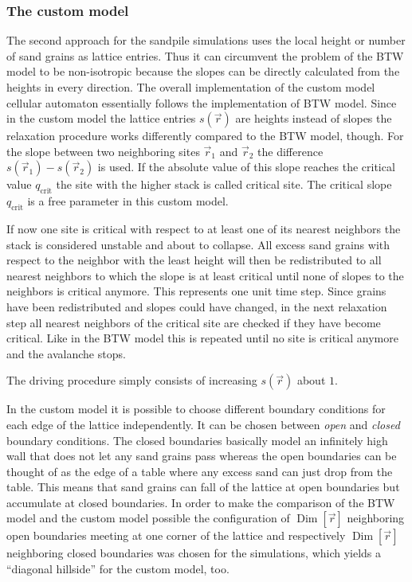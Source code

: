 \subsubsection{The custom model}
The second approach for the sandpile simulations uses the local height or number of sand grains as lattice entries.
Thus it can circumvent the problem of the BTW model to be non-isotropic because the slopes can be directly calculated
from the heights in every direction.
The overall implementation of the custom model cellular automaton essentially follows the implementation of BTW model.
Since in the custom model the lattice entries $s(\vec{r})$ are heights instead of slopes the relaxation procedure
works differently compared to the BTW model, though.
For the slope between two neighboring sites $\vec{r}_1$ and $\vec{r}_2$ the difference $s(\vec{r}_1)-s(\vec{r}_2)$ is
used. If the absolute value of this slope reaches the critical value $q_{\mathrm{crit}}$ the site with the higher
stack is called critical site. The critical slope $q_{\mathrm{crit}}$ is a free parameter in this custom model.

If now one site is critical with respect to at least one of its nearest neighbors the stack is considered unstable
and about to collapse. All excess sand grains with respect to the neighbor with the least height will then be
redistributed to all nearest neighbors to which the slope is at least critical until none of slopes to the neighbors
is critical anymore. This represents one unit time step.
Since grains have been redistributed and slopes could have changed, in the next relaxation step all nearest neighbors
of the critical site are checked if they have become critical. Like in the BTW model this is repeated until no site
is critical anymore and the avalanche stops.

The driving procedure simply consists of increasing $s(\vec{r})$ about $1$.

In the custom model it is possible to choose different boundary conditions for each edge of the lattice independently.
It can be chosen between \emph{open} and \emph{closed} boundary conditions. The closed boundaries basically model an
infinitely high wall that does not let any sand grains pass whereas the open boundaries can be thought of as the edge
of a table where any excess sand can just drop from the table. This means that sand grains can fall of the lattice at
open boundaries but accumulate at closed boundaries.
In order to make the comparison of the BTW model and the custom model possible the configuration of
$\operatorname{Dim}\left[\vec{r}\right]$ neighboring open boundaries meeting at one corner of the lattice and
respectively $\operatorname{Dim}\left[\vec{r}\right]$ neighboring closed boundaries was chosen for the simulations,
which yields a \enquote{diagonal hillside} for the custom model, too.

